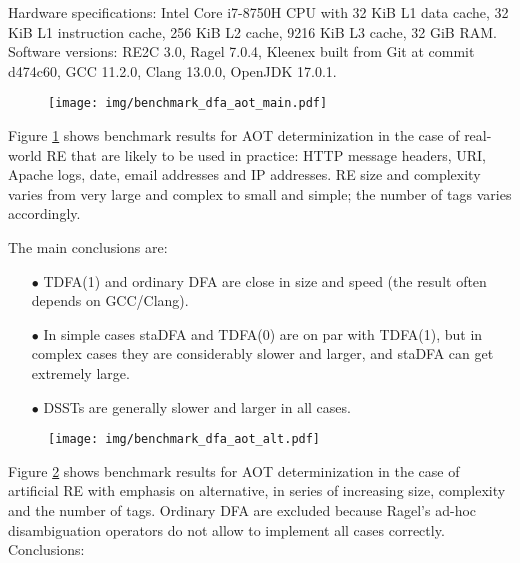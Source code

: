 \documentclass[]{article}
\begin{document}
Hardware specifications:
Intel Core i7-8750H CPU with
32 KiB L1 data cache,
32 KiB L1 instruction cache,
256 KiB L2 cache,
9216 KiB L3 cache,
32 GiB RAM.
%
Software versions:
RE2C 3.0,
Ragel 7.0.4,
Kleenex built from Git at commit d474c60,
GCC 11.2.0,
Clang 13.0.0,
OpenJDK 17.0.1.
\medskip

\pagebreak

\begin{figure}[t!]
\texttt{[image: img/benchmark\_dfa\_aot\_main.pdf]}
\label{fig:benchmark_dfa_aot_main}
\medskip
\end{figure}

Figure \ref{fig:benchmark_dfa_aot_main} shows benchmark results for AOT determinization
in the case of real-world RE that are likely to be used in practice:
HTTP message headers, URI, Apache logs, date, email addresses and IP addresses.
RE size and complexity varies from very large and complex to small and simple;
the number of tags varies accordingly.
\medskip

The main conclusions are:
\medskip

\begin{itemize}

\item[$\bullet$]
TDFA(1) and ordinary DFA are close in size and speed (the result often depends on GCC/Clang).
\medskip

\item[$\bullet$]
In simple cases staDFA and TDFA(0) are on par with TDFA(1),
but in complex cases they are considerably slower and larger,
and staDFA can get extremely large.
\medskip

\item[$\bullet$]
DSSTs are generally slower and larger in all cases.

\end{itemize}

\pagebreak

\begin{figure}[t!]
\texttt{[image: img/benchmark\_dfa\_aot\_alt.pdf]}
\label{fig:benchmark_dfa_aot_alt}
\medskip
\end{figure}

Figure \ref{fig:benchmark_dfa_aot_alt} shows benchmark results for AOT determinization
in the case of artificial RE with emphasis on alternative, in series of increasing size, complexity and the number of tags.
Ordinary DFA are excluded because Ragel's ad-hoc disambiguation operators do not allow to implement all cases correctly.
Conclusions:
\medskip
\end{document}
